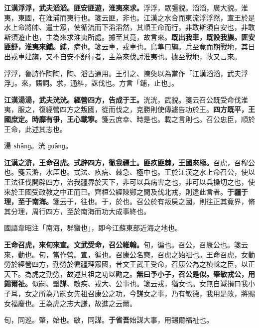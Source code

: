 \textbf{江漢浮浮，武夫滔滔。匪安匪遊，淮夷來求。}{\footnotesize 浮浮，眾彊貌。滔滔，廣大貌。淮夷，東國，在淮浦而夷行也。箋云匪，非也。江漢之水合而東流浮浮然，宣王於是水上命將帥、遣士眾，使循流而下滔滔然，其順王命而行，非敢斯須自安也，非敢斯須遊止也，主為來求淮夷所處。據至其竟，故言來。}\textbf{既出我車，既設我旟。匪安匪舒，淮夷來鋪。}{\footnotesize 鋪，病也。箋云車，戎車也。鳥隼曰旟。兵至竟而期戰地，其日出戎車建旟，又不自安不舒行者，主為來伐討淮夷也。據至戰地，故又言來。}

\begin{quoting}浮浮，魯詩作陶陶，陶、滔古通用。王引之、陳奐以為當作「江漢滔滔，武夫浮浮」。來，語詞。求，通糾，誅伐也。方言「鋪，止也」。\end{quoting}

\textbf{江漢湯湯，武夫洸洸。經營四方，告成于王。}{\footnotesize 洸洸，武貌。箋云召公既受命伐淮夷，服之，復經營四方之叛國，從而伐之，克勝則使傳遽告功於王。}\textbf{四方既平，王國庶定。時靡有爭，王心載寧。}{\footnotesize 箋云庶幸、時是也。載之言則也。召公忠臣，順於王命，此述其志也。}

\begin{quoting}湯 \texttt{shāng}。洸 \texttt{guāng}。\end{quoting}

\textbf{江漢之滸，王命召虎。式辟四方，徹我疆土。匪疚匪棘，王國來極。}{\footnotesize 召虎，召穆公也。箋云滸，水厓也。式法、疚病、棘急、極中也。王於江漢之水上命召公，使以王法征伐開辟四方，治我疆界於天下，非可以兵病害之也，非可以兵操切之也，使來於王國受政教之中正而已。齊桓公經陳鄭之間及伐北戎，則違此言者。}\textbf{于疆于理，至于南海。}{\footnotesize 箋云于，往也。于，於也。召公於有叛戾之國，則往正其竟界，脩其分理，周行四方，至於南海而功大成事終也。}

\begin{quoting}國語韋昭注「南海，群蠻也」，即今江蘇東部近海之地也。\end{quoting}

\textbf{王命召虎，來旬來宣。文武受命，召公維翰。}{\footnotesize 旬，徧也。召公，召康公也。箋云來，勤也。旬，當作營。宣，徧也。召康公名奭，召虎之始祖也。王命召虎，女勤勞於經營四方，勤勞於徧疆理眾國，昔文王武王受命，召康公為之楨榦之臣，以正天下。為虎之勤勞，故述其祖之功以勸之。}\textbf{無曰予小子，召公是似。肇敏戎公，用錫爾祉。}{\footnotesize 似嗣、肇謀、敏疾、戎大、公事也。箋云戎，猶女也。女無自減損曰我小子耳，女之所為乃嗣女先祖召康公之功，今謀女之事，乃有敏德，我用是故，將賜女福慶也。王為虎之志大謙，故進之云爾。}

\begin{quoting}旬，同巡。肇，始也。敏，同謀。\textbf{于省吾}始謀大事，用錫爾福祉也。\end{quoting}


